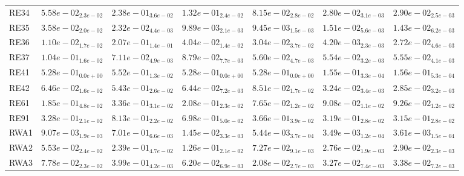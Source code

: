 \documentclass{article}
\begin{document}
\begin{table}
\begin{scriptsize}
\begin{tabular}{lllllll}
RE34 & $  5.58e-02_{ 2.3e-02}$ & $  2.38e-01_{ 3.6e-02}$ & $  1.32e-01_{ 2.4e-02}$ & $  8.15e-02_{ 2.8e-02}$ & \cellcolor{gray95}$  2.80e-02_{ 3.1e-03}$ & \cellcolor{gray25}$  2.90e-02_{ 2.5e-03}$ \\
RE35 & $  3.58e-02_{ 2.0e-02}$ & $  2.32e-02_{ 4.4e-03}$ & \cellcolor{gray25}$  9.89e-03_{ 2.1e-03}$ & \cellcolor{gray95}$  9.45e-03_{ 1.5e-03}$ & $  1.51e-02_{ 5.6e-03}$ & $  1.43e-02_{ 6.2e-03}$ \\
RE36 & \cellcolor{gray25}$  1.10e-02_{ 1.7e-02}$ & $  2.07e-01_{ 1.4e-01}$ & $  4.04e-02_{ 1.4e-02}$ & $  3.04e-02_{ 3.7e-02}$ & \cellcolor{gray95}$  4.20e-03_{ 2.3e-03}$ & $  2.72e-02_{ 4.6e-03}$ \\
RE37 & $  1.04e-01_{ 1.6e-02}$ & $  7.11e-02_{ 4.9e-03}$ & $  8.79e-02_{ 7.7e-03}$ & $  5.60e-02_{ 4.7e-03}$ & \cellcolor{gray95}$  5.54e-02_{ 3.2e-03}$ & \cellcolor{gray25}$  5.55e-02_{ 4.1e-03}$ \\
RE41 & $  5.28e-01_{ 0.0e+00}$ & $  5.52e-01_{ 1.3e-02}$ & $  5.28e-01_{ 0.0e+00}$ & $  5.28e-01_{ 0.0e+00}$ & \cellcolor{gray95}$  1.55e-01_{ 3.3e-04}$ & \cellcolor{gray25}$  1.56e-01_{ 5.3e-04}$ \\
RE42 & $  6.46e-02_{ 1.6e-02}$ & $  5.43e-01_{ 2.6e-02}$ & $  6.44e-02_{ 7.2e-03}$ & $  8.51e-02_{ 1.7e-02}$ & \cellcolor{gray25}$  3.24e-02_{ 3.4e-03}$ & \cellcolor{gray95}$  2.85e-02_{ 3.2e-03}$ \\
RE61 & $  1.85e-01_{ 4.8e-02}$ & $  3.36e-01_{ 3.1e-02}$ & $  2.08e-01_{ 2.3e-02}$ & \cellcolor{gray95}$  7.65e-02_{ 1.2e-02}$ & \cellcolor{gray25}$  9.08e-02_{ 1.1e-02}$ & $  9.26e-02_{ 1.2e-02}$ \\
RE91 & $  3.28e-01_{ 2.1e-02}$ & $  8.13e-01_{ 2.2e-02}$ & $  6.98e-01_{ 5.0e-02}$ & $  3.66e-01_{ 3.9e-02}$ & \cellcolor{gray25}$  3.19e-01_{ 2.8e-02}$ & \cellcolor{gray95}$  3.15e-01_{ 2.8e-02}$ \\
RWA1 & $  9.07e-03_{ 1.9e-03}$ & $  7.01e-01_{ 6.6e-03}$ & $  1.45e-02_{ 3.3e-03}$ & $  5.44e-03_{ 3.7e-04}$ & \cellcolor{gray95}$  3.49e-03_{ 1.2e-04}$ & \cellcolor{gray25}$  3.61e-03_{ 1.5e-04}$ \\
RWA2 & $  5.53e-02_{ 2.4e-02}$ & $  2.39e-01_{ 4.7e-02}$ & $  1.26e-01_{ 2.1e-02}$ & $  7.27e-02_{ 9.1e-03}$ & \cellcolor{gray95}$  2.76e-02_{ 1.9e-03}$ & \cellcolor{gray25}$  2.90e-02_{ 2.3e-03}$ \\
RWA3 & $  7.78e-02_{ 2.3e-02}$ & $  3.99e-01_{ 4.2e-03}$ & $  6.20e-02_{ 6.9e-03}$ & \cellcolor{gray95}$  2.08e-02_{ 2.7e-03}$ & \cellcolor{gray25}$  3.27e-02_{ 7.4e-03}$ & $  3.38e-02_{ 7.2e-03}$ \\

\end{tabular}
\end{scriptsize}
\end{table}
\end{document}

